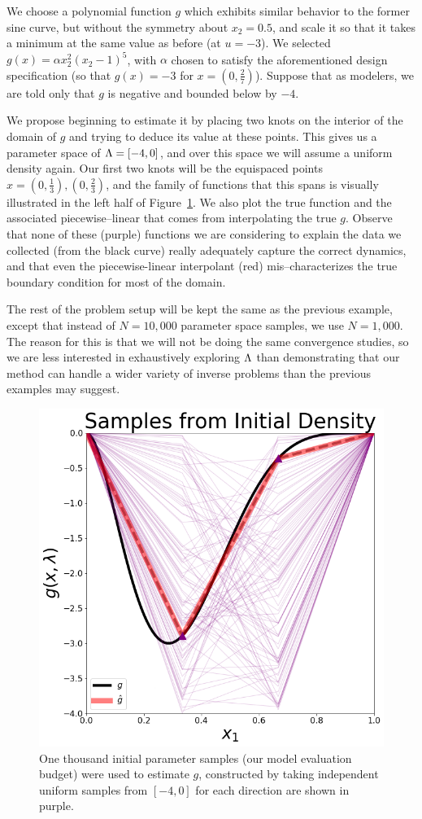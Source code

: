 We choose a polynomial function $g$ which exhibits similar behavior to the former sine curve, but without the symmetry about $x_2=0.5$, and scale it so that it takes a minimum at the same value as before (at $u = -3$).
We selected $g(x) = \alpha x_2^2 (x_2 - 1)^5$, with $\alpha$ chosen to satisfy the aforementioned design specification (so that $g(x)=-3$ for $x=(0,\frac{2}{7})$).
Suppose that as modelers, we are told only that $g$ is negative and bounded below by $-4$.

We propose beginning to estimate it by placing two knots on the interior of the domain of $g$ and trying to deduce its value at these points.
This gives us a parameter space of ${\Lambda} = [-4, 0]$, and over this space we will assume a uniform density again.
Our first two knots will be the equispaced points $x = (0,\frac{1}{3}), (0,\frac{2}{3})$, and the family of functions that this spans is visually illustrated in the left half of Figure~\ref{fig:pde-highd-initial-2d}.
We also plot the true function and the associated piecewise--linear that comes from interpolating the true $g$.
Observe that none of these (purple) functions we are considering to explain the data we collected (from the black curve) really adequately capture the correct dynamics, and that even the piecewise-linear interpolant (red) mis--characterizes the true boundary condition for most of the domain.

The rest of the problem setup will be kept the same as the previous example, except that instead of $N=10,000$ parameter space samples, we use $N=1,000$.
The reason for this is that we will not be doing the same convergence studies, so we are less interested in exhaustively exploring ${\Lambda}$ than demonstrating that our method can handle a wider variety of inverse problems than the previous examples may suggest.

\begin{figure}
\centering
  \includegraphics[width=0.475\linewidth]{figures/pde-highd/pde-highd_init_D2.png}
\caption{
One thousand initial parameter samples (our model evaluation budget) were used to estimate $g$, constructed by taking independent uniform samples from $[-4, 0]$ for each direction are shown in purple.
}
\label{fig:pde-highd-initial-2d}
\end{figure}


